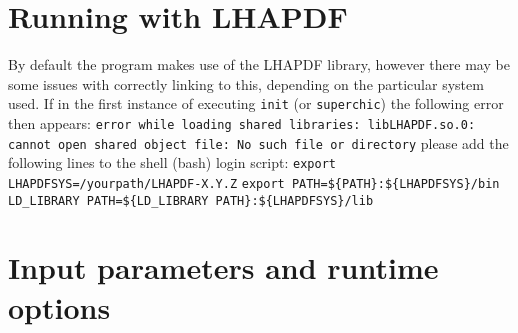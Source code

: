 \documentclass[12pt]{article}
\begin{document}
\section{Running with LHAPDF}

By default the program makes use of the LHAPDF library, however there may be some issues with correctly linking to this, depending on the particular system used. 
If in the first instance of executing \texttt{init} (or \texttt{superchic}) the following error then appears:
\newline
\newline
\texttt{error while loading shared libraries: libLHAPDF.so.0: cannot open
shared object file: No such file or directory}
\newline
\newline
please add the following lines to the shell (bash) login script:
\newline
\newline
\texttt{export LHAPDFSYS=/yourpath/LHAPDF-X.Y.Z}
\newline
\texttt{export PATH=\$\{PATH\}:\$\{LHAPDFSYS\}/bin}
\newline
\texttt{LD\_LIBRARY PATH=\$\{LD\_LIBRARY PATH\}:\$\{LHAPDFSYS\}/lib}


\section{Input parameters and runtime options}
\end{document}
